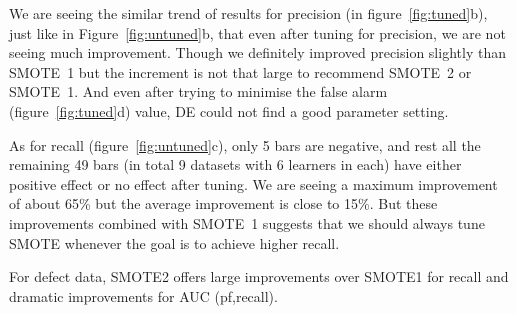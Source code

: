We are seeing the similar trend of results for precision (in figure~\ref{fig:tuned}b), just like in Figure~\ref{fig:untuned}b, that even after tuning for precision, we are not seeing much improvement. Though we definitely improved precision slightly than SMOTE~1 but the increment is not that large to recommend SMOTE~2 or SMOTE~1. And even after trying to minimise the false alarm (figure~\ref{fig:tuned}d) value, DE could not find a good parameter setting.

As for recall (figure~\ref{fig:untuned}c), only 5 bars are negative, and rest all the remaining 49 bars (in total 9 datasets with 6 learners in each) have either positive effect or no effect after tuning. We are seeing a maximum improvement of about 65\% but the average improvement is close to 15\%. But these improvements combined with SMOTE~1 suggests that we should always tune SMOTE whenever the goal is to achieve higher recall.

\begin{lesson}
    For defect data, SMOTE2  
 offers   large  improvements over SMOTE1 for recall
 and dramatic improvements for AUC (pf,recall).
\end{lesson}

